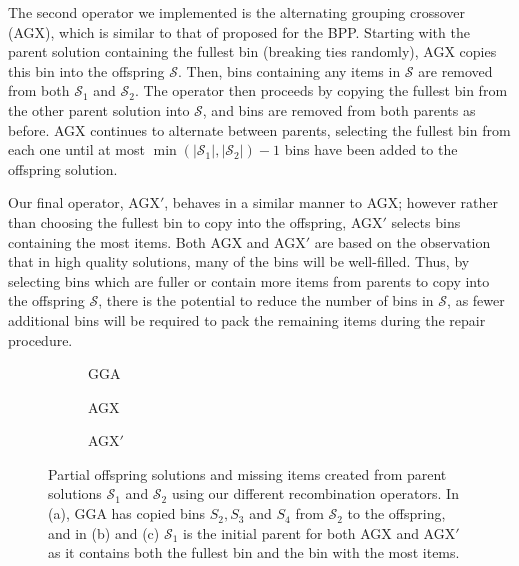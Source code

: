 \documentclass[a4paper,11pt,authoryear]{elsarticle}
\begin{document}
The second operator we implemented is the alternating grouping crossover (AGX), which is similar to that of \cite{quiroz2015} proposed for the BPP. Starting with the parent solution containing the fullest bin (breaking ties randomly), AGX copies this bin into the offspring $\mathcal{S}$. Then, bins containing any items in $\mathcal{S}$ are removed from both $\mathcal{S}_1$ and $\mathcal{S}_2$. The operator then proceeds by copying the fullest bin from the other parent solution into $\mathcal{S}$, and bins are removed from both parents as before. AGX continues to alternate between parents, selecting the fullest bin from each one until at most $\min (|\mathcal{S}_1|,|\mathcal{S}_2|) - 1$ bins have been added to the offspring solution.

Our final operator, AGX$'$, behaves in a similar manner to AGX; however rather than choosing the fullest bin to copy into the offspring, AGX$'$ selects bins containing the most items. Both AGX and AGX$'$ are based on the observation that in high quality solutions, many of the bins will be well-filled. Thus, by selecting bins which are fuller or contain more items from parents to copy into the offspring $\mathcal{S}$, there is the potential to reduce the number of bins in $\mathcal{S}$, as fewer additional bins will be required to pack the remaining items during the repair procedure.

\begin{figure}[h!]	
	\centering
	\begin{minipage}{0.28\textwidth}
		
	\end{minipage} \hspace{15mm}
	\begin{minipage}{0.28\textwidth}
		
	\end{minipage}
\end{figure}

\begin{figure}[h!]	
	\centering
	\begin{subfigure}[h]{0.3\textwidth}
		
		\caption{GGA}
		\label{fig:gga}
	\end{subfigure} \hspace{5mm}
	\begin{subfigure}[h]{0.3\textwidth}
		
		\caption{AGX}
		\label{fig:agx}
	\end{subfigure} \hspace{5mm}
	\begin{subfigure}[h]{0.3\textwidth}
		
		\caption{AGX$'$}
		\label{fig:agxdash}
	\end{subfigure}
	\caption{Partial offspring solutions and missing items created from parent solutions $\mathcal{S}_1$ and $\mathcal{S}_2$ using our different recombination operators. In (a), GGA has copied bins $S_2, S_3$ and $S_4$ from $\mathcal{S}_2$ to the offspring, and in (b) and (c) $\mathcal{S}_1$ is the initial parent for both AGX and AGX$'$ as it contains both the fullest bin and the bin with the most items.}
	\label{fig:recomb}
\end{figure}
\end{document}

